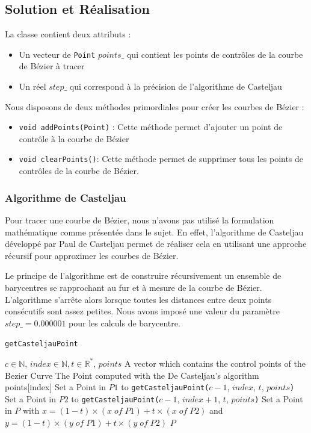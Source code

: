 \documentclass[a4paper, 12pt]{article}
\begin{document}
\subsection{Solution et Réalisation}
La classe contient deux attributs : 
\begin{itemize}
	\item Un vecteur de \texttt{Point} $points\_$ qui contient les points de contrôles de la courbe de Bézier à tracer
 	\item Un réel $step\_$ qui correspond à la précision de l'algorithme de Casteljau
\end{itemize}
\vspace*{0.5cm}
Nous disposons de deux méthodes primordiales pour créer les courbes de Bézier :
\begin{itemize}
\item \texttt{void addPoints(Point)} : Cette méthode permet d'ajouter un point de contrôle à la courbe de Bézier
\item \texttt{void clearPoints()}: Cette méthode permet de supprimer tous les points de contrôles de la courbe de Bézier.
\end{itemize}

\subsubsection{Algorithme de Casteljau}
Pour tracer une courbe de Bézier, nous n'avons pas utilisé la formulation mathématique comme présentée dans le sujet. En effet, l’algorithme de Casteljau développé par Paul de Casteljau permet de réaliser cela en utilisant une approche récursif pour approximer les courbes de Bézier.

Le principe de l'algorithme est de construire récursivement un ensemble de barycentres se rapprochant au fur et à mesure de la courbe de Bézier. L'algorithme s'arrête alors lorsque toutes les distances entre deux points consécutifs sont assez petites.
Nous avons imposé une valeur du paramètre $step\_ = 0.000001$ pour les calculs de barycentre.

\begin{algorithm}
	\caption{\texttt{getCasteljauPoint}}
		\begin{algorithmic}[1]
		\Require $c \in \mathbb{N}$, $index \in \mathbb{N}, t \in \mathbb{R}^{*}$, $points$ A vector which contains the control points of the Bezier Curve
		\Ensure The Point computed with the De Casteljau's algorithm
			\State \Return points[index] 
		\EndIf
		\State Set a Point in $P1$ to \texttt{getCasteljauPoint(}$c-1$, $index$, $t$, $points$\texttt{)} 
		\State Set a Point in $P2$ to \texttt{getCasteljauPoint(}$c-1$, $index+1$, $t$, $points$\texttt{)} 
		\State Set a Point in $P$ with $x = (1-t) \times (x \; of \; P1) + t \times (x \; of \; P2)$ and $y = (1-t) \times (y \; of \; P1) + t \times (y \; of \; P2)$
		\State \Return $P$
		\EndFunction
		\end{algorithmic}
\end{algorithm}
\end{document}
